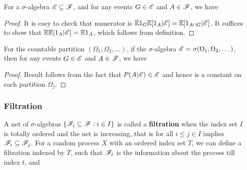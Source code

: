 \documentclass[letterpaper,10pt,english]{article}
\begin{document}
\begin{thm} 
For a $\sigma$-algebra $\mathscr{E} \subseteq \mathscr{F}$, and for any events $G \in \mathscr{E}$ and $A \in \mathscr{F}$, we have 
\end{thm}
\begin{proof}
It is easy to check that numerator is $\mathbb{E} 1_G\mathbb{E}[1_A|\mathscr{E}] = \mathbb{E}[1_{A \cap G}|\mathscr{E}]$. 
It suffices to show that $\mathbb{E}\mathbb{E}[1_A|\mathscr{E}] = \mathbb{E} 1_A$, which follows from definition. 
\end{proof}
\begin{cor} 
For the countable partition $(\Omega_1, \Omega_2, \dots)$, if the $\sigma$-algebra $\mathscr{E} = \sigma(\Omega_1, \Omega_2, \dots)$, then for any events $G \in \mathscr{E}$ and $A \in \mathscr{F}$, we have 
\end{cor}
\begin{proof}
Result follows from the fact that $P(A|\mathscr{E}) \in \mathscr{E}$ and hence is a constant on each partition $\Omega_j$. %
\end{proof}

\subsubsection{Filtration}
A net of $\sigma$-algebras $\{\mathscr{F}_i \subseteq \mathscr{F}: i \in I\}$ is called a \textbf{filtration} when the index set $I$ is totally ordered and the net is increasing, that is for all $i \leqslant j \in I$ implies $\mathscr{F}_i \subseteq \mathscr{F}_j$. 
For a random process $X$ with an ordered index set $T$, we can define a filtration indexed by $T$, such that $\mathscr{F}_t$ is the information about the process till index $t$, and 
\end{document}

